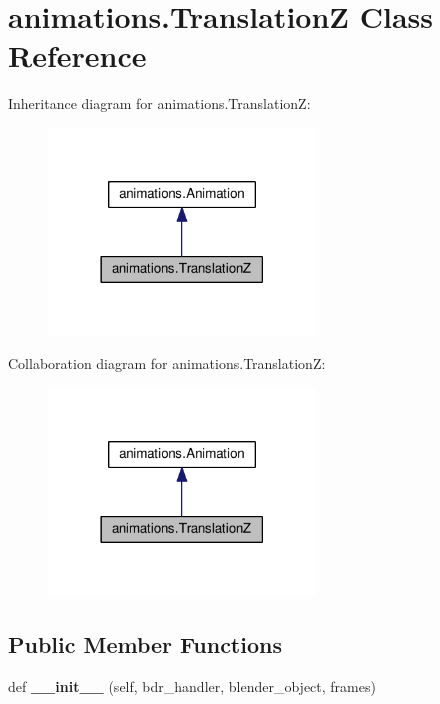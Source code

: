 \hypertarget{classanimations_1_1TranslationZ}{}\section{animations.\+TranslationZ Class Reference}
\label{classanimations_1_1TranslationZ}


Inheritance diagram for animations.\+TranslationZ\+:\nopagebreak
\begin{figure}[H]
\begin{center}
\leavevmode
\includegraphics[width=201pt]{classanimations_1_1TranslationZ__inherit__graph}
\end{center}
\end{figure}


Collaboration diagram for animations.\+TranslationZ\+:\nopagebreak
\begin{figure}[H]
\begin{center}
\leavevmode
\includegraphics[width=201pt]{classanimations_1_1TranslationZ__coll__graph}
\end{center}
\end{figure}
\subsection*{Public Member Functions}
\begin{DoxyCompactItemize}
\item 
def {\bfseries \+\_\+\+\_\+init\+\_\+\+\_\+} (self, bdr\+\_\+handler, blender\+\_\+object, frames)\hypertarget{classanimations_1_1TranslationZ_ae0da43143baf3a4b80e88d476083446b}{}\label{classanimations_1_1TranslationZ_ae0da43143baf3a4b80e88d476083446b}

\end{DoxyCompactItemize}
